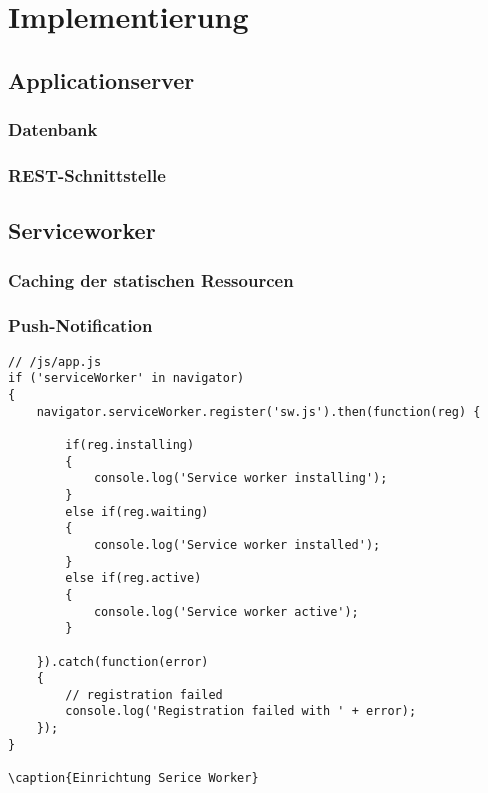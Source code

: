 \chapter{Implementierung}

\section{Applicationserver}

\subsection{Datenbank}

\subsection{REST-Schnittstelle}

\section{Serviceworker}

\subsection{Caching der statischen Ressourcen}

\subsection{Push-Notification}


\begin{lstlisting}
// /js/app.js
if ('serviceWorker' in navigator)
{
    navigator.serviceWorker.register('sw.js').then(function(reg) {

        if(reg.installing)
        {
            console.log('Service worker installing');
        } 
        else if(reg.waiting)
        {
            console.log('Service worker installed');
        } 
        else if(reg.active)
        {
            console.log('Service worker active');
        }

    }).catch(function(error)
    {
        // registration failed
        console.log('Registration failed with ' + error);
    });
}

\caption{Einrichtung Serice Worker}
\end{lstlisting}

